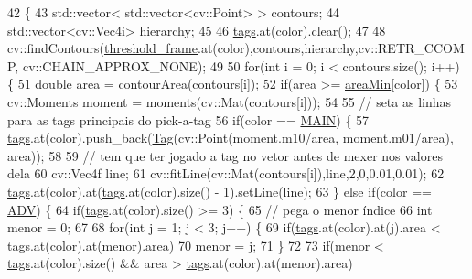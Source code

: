 \begin{DoxyCode}
42                                  \{
43     std::vector< std::vector<cv::Point> > contours;
44     std::vector<cv::Vec4i> hierarchy;
45 
46     \hyperlink{class_vision_acc5bbdf18ba36cc516c17999308be267}{tags}.at(color).clear();
47 
48     cv::findContours(\hyperlink{class_vision_a2fee2db2d4fe0cee6b2de36ee0eb6c7f}{threshold\_frame}.at(color),contours,hierarchy,cv::RETR\_CCOMP,
      cv::CHAIN\_APPROX\_NONE);
49 
50     \textcolor{keywordflow}{for}(\textcolor{keywordtype}{int} i = 0; i < contours.size(); i++) \{
51         \textcolor{keywordtype}{double} area = contourArea(contours[i]);
52         \textcolor{keywordflow}{if}(area >= \hyperlink{class_vision_a674b5bf7f6570f5b8e053ee28a9721ff}{areaMin}[color]) \{
53             cv::Moments moment = moments(cv::Mat(contours[i]));
54 
55             \textcolor{comment}{// seta as linhas para as tags principais do pick-a-tag}
56             \textcolor{keywordflow}{if}(color == \hyperlink{class_vision_ae7d1888ee66883aabbdfc7390d338367}{MAIN}) \{
57                 \hyperlink{class_vision_acc5bbdf18ba36cc516c17999308be267}{tags}.at(color).push\_back(\hyperlink{class_tag}{Tag}(cv::Point(moment.m10/area, moment.m01/area), area));
58 
59                 \textcolor{comment}{// tem que ter jogado a tag no vetor antes de mexer nos valores dela}
60                 cv::Vec4f line;
61                 cv::fitLine(cv::Mat(contours[i]),line,2,0,0.01,0.01);
62                 \hyperlink{class_vision_acc5bbdf18ba36cc516c17999308be267}{tags}.at(color).at(\hyperlink{class_vision_acc5bbdf18ba36cc516c17999308be267}{tags}.at(color).size() - 1).setLine(line);
63             \} \textcolor{keywordflow}{else} \textcolor{keywordflow}{if}(color == \hyperlink{class_vision_ac1903844090d6721f5c854621c516d8f}{ADV}) \{
64                 \textcolor{keywordflow}{if}(\hyperlink{class_vision_acc5bbdf18ba36cc516c17999308be267}{tags}.at(color).size() >= 3) \{
65                     \textcolor{comment}{// pega o menor índice}
66                     \textcolor{keywordtype}{int} menor = 0;
67 
68                     \textcolor{keywordflow}{for}(\textcolor{keywordtype}{int} j = 1; j < 3; j++) \{
69                         \textcolor{keywordflow}{if}(\hyperlink{class_vision_acc5bbdf18ba36cc516c17999308be267}{tags}.at(color).at(j).area < \hyperlink{class_vision_acc5bbdf18ba36cc516c17999308be267}{tags}.at(color).at(menor).area)
70                         menor = j;
71                     \}
72 
73                     \textcolor{keywordflow}{if}(menor < \hyperlink{class_vision_acc5bbdf18ba36cc516c17999308be267}{tags}.at(color).size() && area > \hyperlink{class_vision_acc5bbdf18ba36cc516c17999308be267}{tags}.at(color).at(menor).area)

\end{DoxyCode}
